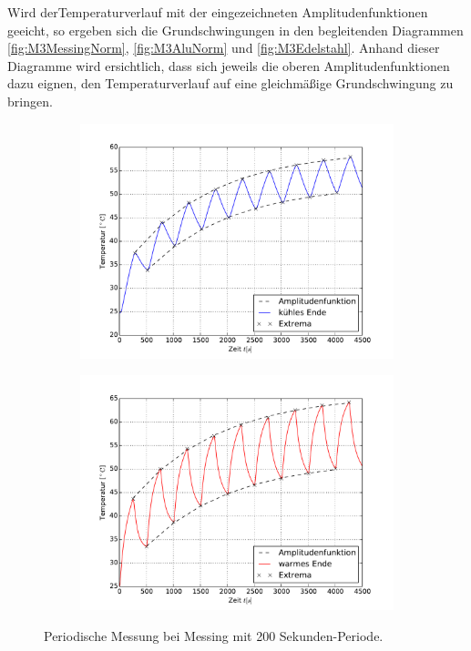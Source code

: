 Wird derTemperaturverlauf mit der eingezeichneten Amplitudenfunktionen geeicht, so ergeben sich die Grundschwingungen in den begleitenden Diagrammen \ref{fig:M3MessingNorm}, \ref{fig:M3AluNorm} und \ref{fig:M3Edelstahl}. 
Anhand dieser Diagramme wird ersichtlich, dass sich jeweils die oberen Amplitudenfunktionen dazu eignen, den Temperaturverlauf auf eine gleichmäßige Grundschwingung zu bringen.
\begin{figure}[h!]
	\centering
	\begin{subfigure}{0.9\textwidth}
	\includegraphics[width=\textwidth]{Bilder/M3_Messing_kuehl.pdf}
	\end{subfigure}
	\begin{subfigure}{0.9\textwidth}
	\includegraphics[width=\textwidth]{Bilder/M3_Messing_warm.pdf}
	\end{subfigure}
	\caption{Periodische Messung bei Messing mit 200 Sekunden-Periode.}
	\label{fig:M3Messing}
\end{figure}
